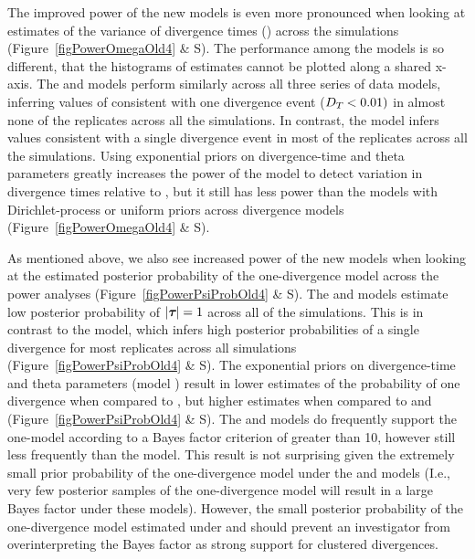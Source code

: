 The improved power of the new models is even more pronounced when looking at
estimates of the variance of divergence times (\divTimeDispersion) across the
simulations
(Figure~\ref{figPowerOmegaOld4} \& 
S).
The performance among the models is so different, that the histograms of
\divTimeDispersion estimates cannot be plotted along a shared x-axis.
The \modelDPP and \modelUniform models perform similarly across all three
series of data models, inferring values of \divTimeDispersion consistent with
one divergence event ($D_{T_{}} < 0.01)$ in almost none of the
replicates across all the simulations.
In contrast, the \modelOld model infers values consistent with a single divergence event in
most of the replicates across all the simulations.
Using exponential priors on divergence-time and theta parameters greatly
increases the power of the \modelUshaped model to detect variation in
divergence times relative to \modelOld, but it still has less power than the
models with Dirichlet-process or uniform priors across divergence models 
(Figure~\ref{figPowerOmegaOld4} \& 
S).

As mentioned above, we also see increased power of the new models when
looking at the estimated posterior probability of the one-divergence model
across the power analyses 
(Figure~\ref{figPowerPsiProbOld4} \& 
S).
The \modelDPP and \modelUniform models estimate low posterior probability of
$\lvert \boldsymbol{\tau_{}} \rvert = 1$ across all of the simulations.
This is in contrast to the \modelOld model, which infers high posterior probabilities of a single
divergence for most replicates across all simulations
(Figure~\ref{figPowerPsiProbOld4} \& 
S).
The exponential priors on divergence-time and theta parameters (model
\modelUshaped) result in lower estimates of the probability of one divergence
when compared to \modelOld, but higher estimates when compared to \modelUniform
and \modelDPP
(Figure~\ref{figPowerPsiProbOld4} \& 
S).
The \modelDPP and \modelUniform models do frequently support the one-model
according to a Bayes factor criterion of greater than 10, however still less
frequently than the \modelOld model.
This result is not surprising given the extremely small prior probability of
the one-divergence model under the \modelDPP and \modelUniform models (I.e.,
very few posterior samples of the one-divergence model will result in a
large Bayes factor under these models).
However, the small posterior probability of the one-divergence model estimated
under \modelDPP and \modelUniform should prevent an investigator from
overinterpreting the Bayes factor as strong support for clustered divergences.


